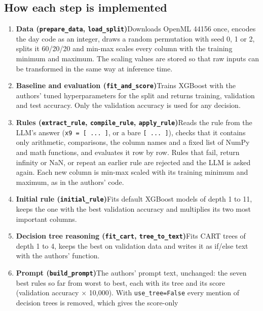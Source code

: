 \documentclass[11pt]{article}
\newcommand{\code}[1]{\texttt{#1}}
\begin{document}
\subsection{How each step is implemented}
\begin{enumerate}[label=\arabic*),leftmargin=*,itemsep=3pt]
\item \textbf{Data (\code{prepare\_data}, \code{load\_split})}\newline Downloads OpenML 44156 once, encodes the day
  code as an integer, draws a random permutation with seed 0, 1 or 2, splits it 60/20/20 and min-max
  scales every column with the training minimum and maximum. The scaling values are stored so that
  raw inputs can be transformed in the same way at inference time.
\item \textbf{Baseline and evaluation (\code{fit\_and\_score})}\newline Trains XGBoost with the authors' tuned
  hyperparameters for the split and returns training, validation and test accuracy. Only the
  validation accuracy is used for any decision.
\item \textbf{Rules (\code{extract\_rule}, \code{compile\_rule}, \code{apply\_rule})}\newline Reads the rule from the
  LLM's answer (\code{x9 = [ ... ]}, or a bare \code{[ ... ]}), checks that it contains only
  arithmetic, comparisons, the column names and a fixed list of NumPy and math functions, and
  evaluates it row by row. Rules that fail, return infinity or NaN, or repeat an earlier rule are
  rejected and the LLM is asked again. Each new column is min-max scaled with its training minimum
  and maximum, as in the authors' code.
\item \textbf{Initial rule (\code{initial\_rule})}\newline Fits default XGBoost models of depth 1 to 11, keeps the
  one with the best validation accuracy and multiplies its two most important columns.
\item \textbf{Decision tree reasoning (\code{fit\_cart}, \code{tree\_to\_text})}\newline Fits CART trees of depth 1
  to 4, keeps the best on validation data and writes it as if/else text with the authors' function.
\item \textbf{Prompt (\code{build\_prompt})}\newline The authors' prompt text, unchanged: the seven best rules so far
  from worst to best, each with its tree and its score (validation accuracy $\times$ 10,000). With
  \code{use\_tree=False} every mention of decision trees is removed, which gives the score-only

\end{enumerate}
\end{document}

